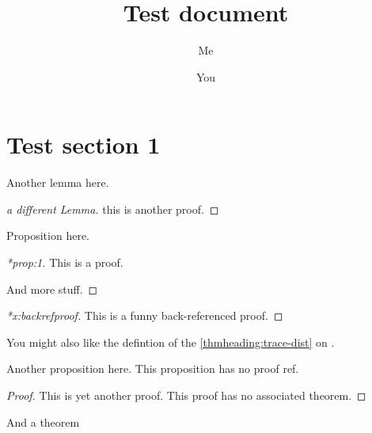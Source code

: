 \documentclass[%
  aps,%
  pra,%
  superscriptaddress,%
  reprint,%
  longbibliography,%
  nofootinbib,%
  notitlepage]{revtex4-2}
\begin{document}
\title{Test document}
\author{Me}
\author{You}
\maketitle


\section{Test section 1}

\begin{lemma}
\label{lem:1}
Another lemma here.
\end{lemma}
\begin{proof}[a different Lemma]
  this is another proof.
\end{proof}



\begin{proposition}
  \label{prop:1}
  Proposition here.
\end{proposition}
\begin{proof}[*prop:1]
  This is a proof.

  And more stuff.
\end{proof}

\begin{proof}[*x:backrefproof]
  This is a funny back-referenced proof.
\end{proof}


You might also like the defintion of the \ref{thmheading:trace-dist} on .

\begin{proposition}
  \noproofref
  Another proposition here.  This proposition has no proof ref.
\end{proposition}

\begin{proof}
  This is yet another proof.  This proof has no associated theorem.
\end{proof}


\begin{theorem}
\label{thm:1}
And a theorem
\end{theorem}
\end{document}
